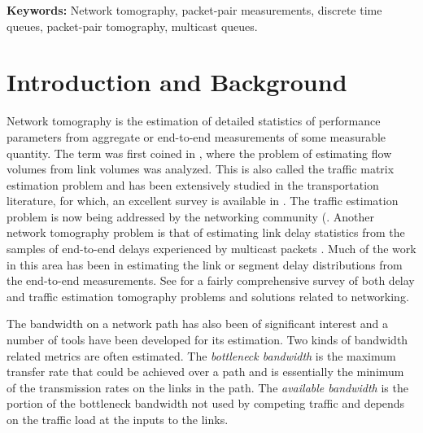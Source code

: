 \documentclass[11pt]{article}
\begin{document}
 \textbf{Keywords:}
 Network tomography, packet-pair measurements, discrete time queues,
 packet-pair tomography, multicast queues.


\section{Introduction and Background}
\label{sec:introduction}

Network tomography is the estimation of detailed statistics of
performance parameters from aggregate or end-to-end measurements of
some measurable quantity. The term was first coined in \cite{Vardi96},
where the problem of estimating flow volumes from link volumes was
analyzed.  This is also called the traffic matrix estimation problem
and has been extensively studied in the transportation literature, for
which, an excellent survey is available in \cite{Abramsson98}.  The
traffic estimation problem is now being addressed by the networking
community
(\cite{Zhang03a,Zhang03b,Medina03,Lakhina04,Papagiannaki04}. Another
network tomography problem is that of estimating link delay statistics
from the samples of end-to-end delays experienced by multicast packets
\cite{Coates01,Tsang01}. Much of the work in this area has been in
estimating the link or segment delay distributions from the end-to-end
measurements. See \cite{Castro04} for a fairly comprehensive survey of
both delay and traffic estimation tomography problems and solutions
related to networking.

The bandwidth on a network path has also been of significant interest
and a number of tools have been developed for its estimation. Two
kinds of bandwidth related metrics are often estimated. The
\emph{bottleneck bandwidth} is the maximum transfer rate that could be
achieved over a path and is essentially the minimum of the
transmission rates on the links in the path. The \emph{available
  bandwidth} is the portion of the bottleneck bandwidth not used by
competing traffic and depends on the traffic load at the inputs to the
links.
\end{document}
